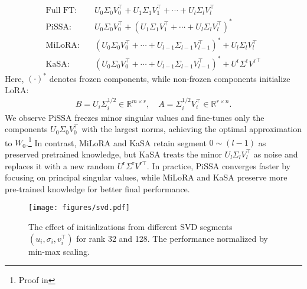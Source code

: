 \begin{equation}
\begin{aligned}
\text{Full FT}: &\quad U_0 \Sigma_0 V_0^\top + U_1 \Sigma_1 V_1^\top + \cdots + U_l \Sigma_l V_l^\top \\
\text{PiSSA}: &\quad U_0 \Sigma_0 V_0^\top + (U_1 \Sigma_1 V_1^\top + \cdots + U_l \Sigma_l V_l^\top)^* \\
\text{MiLoRA}: &\quad (U_0 \Sigma_0 V_0^\top + \cdots + U_{l-1} \Sigma_{l-1} V_{l-1}^\top)^* + U_l \Sigma_l V_l^\top \\
\text{KaSA}: &\quad (U_0 \Sigma_0 V_0^\top + \cdots + U_{l-1} \Sigma_{l-1} V_{l-1}^\top)^* + U^{\text{r}} \Sigma^{\text{r}} {V^{\text{r}}}^\top
\end{aligned}
\end{equation}
Here, $(\cdot)^*$ denotes frozen components, while non-frozen components initialize LoRA:
\begin{align}
B = U_i \Sigma_i^{1/2} \in \mathbb{R}^{m \times r}, \quad A = \Sigma_i^{1/2} V_i^\top \in \mathbb{R}^{r \times n}.\label{eq:ba}
\end{align}
We observe PiSSA freezes minor singular values and fine-tunes only the components $U_0 \Sigma_0 V_0^\top$ with the largest norms, achieving the optimal approximation to $W_0$.\footnote{Proof in } In contrast, MiLoRA and KaSA retain segment $0\sim(l-1)$ as preserved pretrained knowledge, but KaSA treats the minor $U_l \Sigma_l V_l^\top$ as noise and replaces it with a new random $U^{\text{r}} \Sigma^{\text{r}} V^{\text{r}\top}$. In practice, PiSSA converges faster by focusing on principal singular values, while MiLoRA and KaSA preserve more pre-trained knowledge for better final performance.

\begin{figure}[t]
    \centering
    \texttt{[image: figures/svd.pdf]}
    \vspace{-10mm}
    \caption{The effect of initializations from different SVD segments \((u_i, \sigma_i, v_i^\top)\)  for rank 32 and 128. The performance normalized by min-max scaling. }
    \vspace{-10mm}
    \label{fig:intro_rank}
\end{figure}

